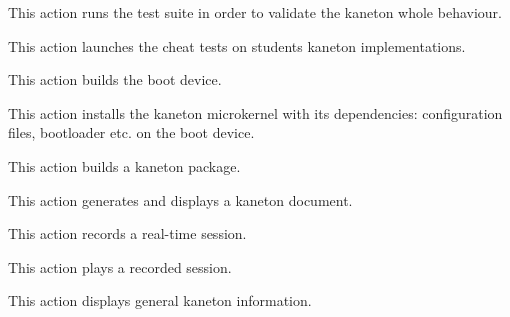 	{
	  This action runs the test suite in order to validate the kaneton
	  whole behaviour.

	  \-

	}

	{
	  This action launches the cheat tests on students kaneton
	  implementations.

	  \-


	  \-

	}

	{
	  This action builds the boot device.

	  \-

	}

	{
	  This action installs the kaneton microkernel with its dependencies:
	  configuration files, bootloader etc. on the boot device.

	  \-

	}

	{
	  This action builds a kaneton package.

	  \-


	  \-

	  \-

	}

	{
	  This action generates and displays a kaneton document.

	  \-


	  \-


	  \-

	}

	{
	  This action records a real-time session.

	  \-


	  \-

	}

	{
	  This action plays a recorded session.

	  \-


	  \-


	  \-

	}

	{
	  This action displays general kaneton information.

	  \-

	}
